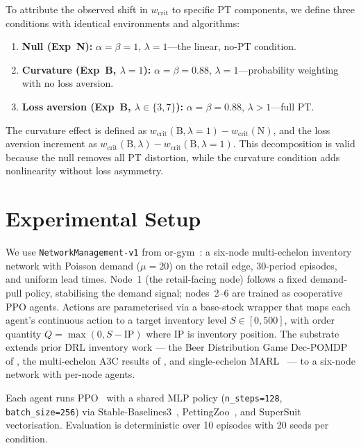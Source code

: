 \documentclass[11pt]{article}
\newcommand{\wcrit}{w_{\mathrm{crit}}}
\begin{document}
To attribute the observed shift in $\wcrit$ to specific PT components, we
define three conditions with identical environments and algorithms:
\begin{enumerate}
  \item \textbf{Null (Exp~N):} $\alpha{=}\beta{=}1$, $\lambda{=}1$---the
        linear, no-PT condition.
  \item \textbf{Curvature (Exp~B, $\lambda{=}1$):}
        $\alpha{=}\beta{=}0.88$, $\lambda{=}1$---probability weighting
        with no loss aversion.
  \item \textbf{Loss aversion (Exp~B, $\lambda \in \{3,7\}$):}
        $\alpha{=}\beta{=}0.88$, $\lambda > 1$---full PT.
\end{enumerate}
The curvature effect is defined as
$\wcrit(\text{B},\lambda{=}1) - \wcrit(\text{N})$,
and the loss aversion increment as
$\wcrit(\text{B},\lambda) - \wcrit(\text{B},\lambda{=}1)$.
This decomposition is valid because the null removes all PT distortion,
while the curvature condition adds nonlinearity without loss asymmetry.

\section{Experimental Setup}
\label{sec:setup}

We use \texttt{NetworkManagement-v1} from or-gym~\citep{hubbs2020orgym}:
a six-node multi-echelon inventory network with Poisson demand
($\mu{=}20$) on the retail edge, 30-period episodes, and uniform lead
times.
Node~1 (the retail-facing node) follows a fixed demand-pull policy,
stabilising the demand signal; nodes~2--6 are trained as cooperative PPO
agents.
Actions are parameterised via a base-stock wrapper that maps each
agent's continuous action to a target inventory level $S \in [0, 500]$,
with order quantity $Q = \max(0, S - \mathrm{IP})$ where $\mathrm{IP}$
is inventory position.
The substrate extends prior DRL inventory work --- the Beer Distribution
Game Dec-POMDP of \citet{oroojlooyjadid2022}, the multi-echelon A3C
results of \citet{gijsbrechts2022}, and single-echelon
MARL~\citep{marlim2023} --- to a six-node network with per-node agents.

Each agent runs PPO~\citep{schulman2017ppo} with a shared MLP policy
(\texttt{n\_steps=128}, \texttt{batch\_size=256}) via
Stable-Baselines3~\citep{raffin2021sb3}, PettingZoo~\citep{terry2021pettingzoo},
and SuperSuit~\citep{terry2020supersuit} vectorisation.
Evaluation is deterministic over 10 episodes with 20 seeds per condition.
\end{document}

